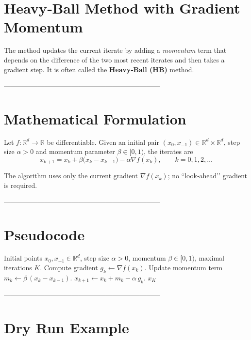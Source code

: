 \documentclass{article}
\begin{document}
\section*{Heavy‑Ball Method with Gradient Momentum}

The method updates the current iterate by adding a \emph{momentum} term that depends on the
difference of the two most recent iterates and then takes a gradient step.  
It is often called the \textbf{Heavy‑Ball (HB)} method.

---------------------------------------------------------------------

\section*{Mathematical Formulation}

Let $f:\mathbb{R}^{d}\rightarrow\mathbb{R}$ be differentiable.
Given an initial pair $(x_{0},x_{-1})\in\mathbb{R}^{d}\times\mathbb{R}^{d}$,
step size $\alpha>0$ and momentum parameter $\beta\in[0,1)$, the iterates are
\[
\boxed{
x_{k+1}=x_{k}+\beta\bigl(x_{k}-x_{k-1}\bigr)-\alpha \nabla f(x_{k}),\qquad k=0,1,2,\dots
}
\tag{HB}
\]

\noindent
The algorithm uses only the current gradient $\nabla f(x_k)$; no “look‑ahead’’ gradient is required.

---------------------------------------------------------------------

\section*{Pseudocode}

\begin{algorithm}[H]
\caption{Heavy‑Ball Method}
\begin{algorithmic}[1]
\REQUIRE Initial points $x_{0},x_{-1}\in\mathbb{R}^{d}$, step size $\alpha>0$, momentum $\beta\in[0,1)$, maximal iterations $K$.
    \STATE Compute gradient $g_{k}\gets \nabla f(x_{k})$.
    \STATE Update momentum term $m_{k}\gets \beta\,(x_{k}-x_{k-1})$.
    \STATE $x_{k+1}\gets x_{k}+m_{k}-\alpha\,g_{k}$.
\ENDFOR
\RETURN $x_{K}$
\end{algorithmic}
\end{algorithm}

---------------------------------------------------------------------

\section*{Dry Run Example}
\end{document}
